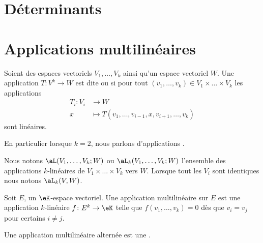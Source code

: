 
\section{Déterminants}
\label{SecGYzHWs}


\section{Applications multilinéaires}

\begin{definition}       \label{DefFRHooKnPCT}
	Soient des espaces vectoriels \( V_1,\ldots,V_k\) ainsi qu'un espace vectoriel \( W\). Une application \(T \colon V^k\to W  \) est dite  ou  si pour tout \( (v_1, \ldots,v_k)\in V_1\times \ldots\times V_k\) les applications
	\begin{equation}
		\begin{aligned}
			T_i\colon V_i & \to W                                                 \\
			x             & \mapsto T(v_1,\ldots, v_{i-1}, x,v_{i+1},\ldots, v_k)
		\end{aligned}
	\end{equation}
	sont linéaires.

	En particulier lorsque \( k=2\), nous parlons d'applications .

	Nous notons \( \aL(V_1,\ldots,V_k;W)\) ou \( \aL_k(V_1,\ldots,V_k;W)\) l'ensemble des applications \( k\)-linéaires de \( V_1\times \ldots \times V_k\) vers \( W\). Lorsque tout les \( V_i\) sont identiques nous notons \( \aL_k(V,W)\).
\end{definition}


\begin{definition}       \label{DEFooYWOBooUGJojy}
	Soit \( E\), un \( \eK\)-espace vectoriel. Une application multilinéaire  sur \( E\) est une application \( k\)-linéaire \( f\colon E^k\to \eK\) telle que \( f(v_1,\ldots, v_k)=0\) dès que \( v_i=v_j\) pour certains \( i\neq j\).

	Une application multilinéaire alternée est une .
\end{definition}

